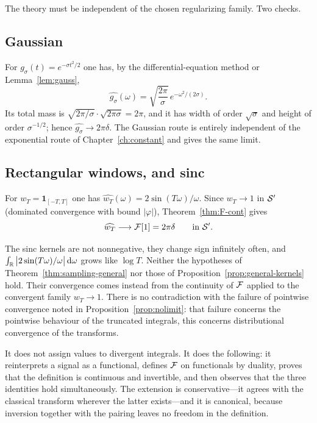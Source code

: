 The theory must be independent of the chosen regularizing family. Two checks.

\subsection*{Gaussian}

For $g_{\sigma}(t)=e^{-\sigma t^{2}/2}$ one has, by the differential-equation method or
Lemma~\ref{lem:gauss},
\begin{equation}
\widehat{g_{\sigma}}(\omega)=\sqrt{\frac{2\pi}{\sigma}}\,e^{-\omega^{2}/(2\sigma)} .
\end{equation}
Its total mass is
$\sqrt{2\pi/\sigma}\cdot\sqrt{2\pi\sigma}=2\pi$, and it has width of order $\sqrt{\sigma}$ and height
of order $\sigma^{-1/2}$; hence $\widehat{g_{\sigma}}\to2\pi\delta$. The Gaussian route is entirely
independent of the exponential route of Chapter~\ref{ch:constant} and gives the same limit.

\subsection*{Rectangular windows, and sinc}

For $w_{T}=\mathbf{1}_{[-T,T]}$ one has $\widehat{w_{T}}(\omega)=2\sin(T\omega)/\omega$. Since
$w_{T}\to1$ in $\mathcal{S}'$ (dominated convergence with bound $|\varphi|$), Theorem~\ref{thm:F-cont} gives
\begin{equation}
\widehat{w_{T}}\longrightarrow\mathcal{F}[1]=2\pi\delta
\qquad\text{in }\mathcal{S}'.
\end{equation}

\begin{remark}
The sinc kernels are not nonnegative, they change sign infinitely often, and
$\int_{\mathbb{R}}\big|2\sin(T\omega)/\omega\big|\,\mathrm{d}\omega$ grows like $\log T$. Neither the hypotheses of
Theorem~\ref{thm:sampling-general} nor those of Proposition~\ref{prop:general-kernels} hold. Their
convergence comes instead from the continuity of $\mathcal{F}$ applied to the convergent family $w_{T}\to1$.
There is no contradiction with the failure of pointwise convergence noted in
Proposition~\ref{prop:nolimit}: that failure concerns the pointwise behaviour of the truncated
integrals, this concerns distributional convergence of the transforms.
\end{remark}

\begin{remark}
It does not assign values to divergent integrals. It does the following: it reinterprets a signal as
a functional, defines $\mathcal{F}$ on functionals by duality, proves that the definition is continuous and
invertible, and then observes that the three identities hold simultaneously. The extension is
conservative---it agrees with the classical transform wherever the latter exists---and it is
canonical, because inversion together with the pairing leaves no freedom in the definition.
\end{remark}

